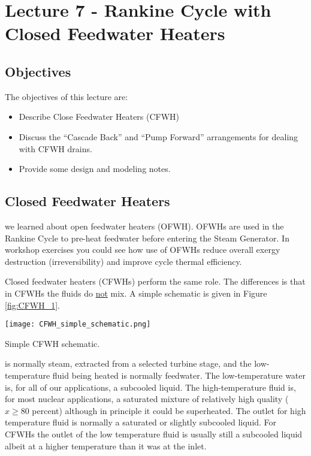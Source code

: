 \chapter{Lecture 7 - Rankine Cycle with Closed Feedwater Heaters}
\label{ch:ch7}
\section{Objectives}
The objectives of this lecture are:
\begin{itemize}
\item Describe Close Feedwater Heaters (CFWH)
\item Discuss the ``Cascade Back'' and ``Pump Forward'' arrangements for dealing with CFWH drains.
\item Provide some design and modeling notes.
\end{itemize}

\section{Closed Feedwater Heaters}
 we learned about open feedwater heaters (OFWH).  OFWHs are used in the Rankine Cycle to pre-heat feedwater before entering the Steam Generator.  In workshop exercises you could see how use of OFWHs reduce overall exergy destruction (irreversibility) and improve cycle thermal efficiency.  

Closed feedwater heaters (CFWHs) perform the same role.  The differences is that in CFWHs the fluids do \underline{not} mix.  A simple schematic is given in Figure \ref{fig:CFWH_1}.
\begin{marginfigure}
\texttt{[image: CFWH\_simple\_schematic.png]}
\caption{Simple CFWH schematic.}
\label{fig:CFWH_1}
\end{marginfigure}
 is normally steam, extracted from a selected turbine stage, and the low-temperature fluid being heated is normally feedwater.  The low-temperature water is, for all of our applications, a subcooled liquid.  The high-temperature fluid is, for most nuclear applications, a saturated mixture of relatively high quality ($x \ge 80$ percent) although in principle it could be superheated.  The outlet for high temperature fluid is normally a saturated or slightly subcooled liquid. For CFWHs the outlet of the low temperature fluid is usually still a subcooled liquid albeit at a higher temperature than it was at the inlet. 

